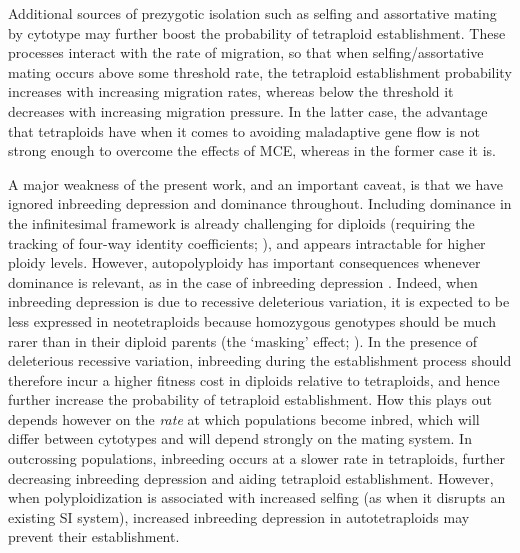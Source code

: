 \documentclass[12pt,a4paper]{article}
\begin{document}
Additional sources of prezygotic isolation such as selfing and assortative
mating by cytotype may further boost the probability of tetraploid
establishment.
These processes interact with the rate of migration, so that when
selfing/assortative mating occurs above some threshold rate, the tetraploid
establishment probability increases with increasing migration rates, whereas
below the threshold it decreases with increasing migration pressure.
In the latter case, the advantage that tetraploids have when it comes to
avoiding maladaptive gene flow is not strong enough to overcome the effects of
MCE, whereas in the former case it is.

A major weakness of the present work, and an important caveat, is that we have
ignored inbreeding depression and dominance throughout.
Including dominance in the infinitesimal framework is already challenging for
diploids (requiring the tracking of four-way identity coefficients;
\cite{barton2023}), and appears intractable for higher ploidy levels.
However, autopolyploidy has important consequences whenever dominance is
relevant, as in the case of inbreeding depression
\citep{ronfort1999,husband2008,clo2022b}.
Indeed, when inbreeding depression is due to recessive deleterious variation,
it is expected to be less expressed in neotetraploids because homozygous genotypes
should be much rarer than in their diploid parents (the `masking' effect;
\cite{otto2000}).
In the presence of deleterious recessive variation, inbreeding during the
establishment process should therefore incur a higher fitness cost in diploids
relative to tetraploids, and hence further increase the probability of
tetraploid establishment.
How this plays out depends however on the \textit{rate} at which populations
become inbred, which will differ between cytotypes and will depend strongly on
the mating system.
In outcrossing populations, inbreeding occurs at a slower rate in tetraploids,
further decreasing inbreeding depression and aiding tetraploid establishment.
However, when polyploidization is associated with increased selfing (as when it
disrupts an existing SI system), increased inbreeding depression in
autotetraploids may prevent their establishment. 
\end{document}
